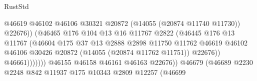 \begin{lexlean}{RustStd}
\begin{coremodule}
                                                  @46619
                                                  @46102
                                                  @46106
                                                  @30321
                                                  @20872
                                                  (@14055 (@20874 @11740 @11730))
                                                  @22676))
                                              (@46465
                                                @176
                                                @104
                                                @13
                                                @16
                                                @11767
                                                @2822
                                                (@46445
                                                  @176
                                                  @13
                                                  @11767
                                                  (@46604
                                                    @175
                                                    @37
                                                    @13
                                                    @2888
                                                    @2898
                                                    @11750
                                                    @11762
                                                    @46619
                                                    @46102
                                                    @46106
                                                    @30426
                                                    @20872
                                                    (@14055 (@20874 @11762 @11751))
                                                    @22676))
                                                @46661)))))))
                                  @46155
                                  @46158
                                  @46161
                                  @46163
                                  @22676))
                              @46679
                              (@46689
                                @2230
                                @2248
                                @842
                                @11937
                                @175
                                @10343
                                @2809
                                @12257
                                (@46699

\end{coremodule}
\end{lexlean}
